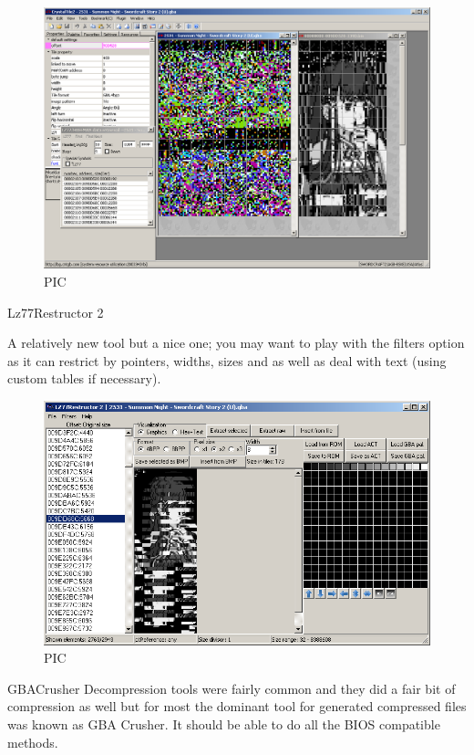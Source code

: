 \documentclass[
]{book}
\begin{document}
\begin{figure}
\centering
\includegraphics{images/189_home_fast6191_romhackingguide_unrenamed_fil___ingguidecompressionsearching_crystaltile2_2.png}
\caption{PIC}
\end{figure}

Lz77Restructor 2

A relatively new tool but a nice one; you may want to play with the filters option as it can restrict by pointers, widths, sizes and as well as deal with text (using custom tables if necessary).

\begin{figure}
\centering
\includegraphics{images/190_home_fast6191_romhackingguide_unrenamed_fil___gguidecompressionsearching_LZ77restructor_1.png}
\caption{PIC}
\end{figure}

GBACrusher Decompression tools were fairly common and they did a fair bit of compression as well but for most the dominant tool for generated compressed files was known as GBA Crusher. It should be able to do all the BIOS compatible methods.
\end{document}
